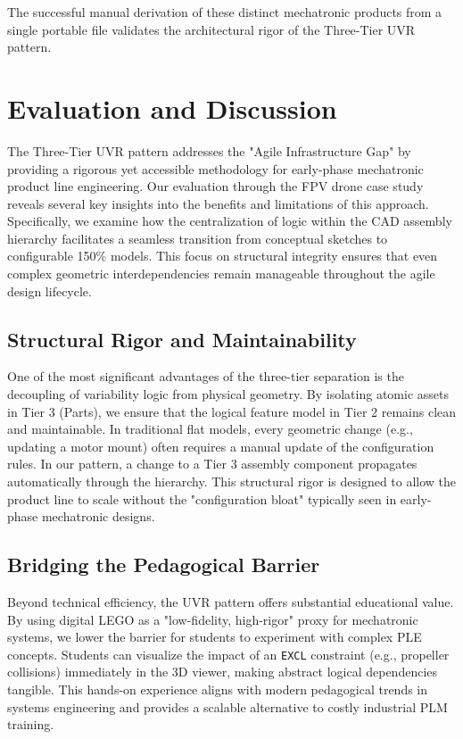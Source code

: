\documentclass[runningheads]{llncs}
\begin{document}
The successful manual derivation of these distinct mechatronic products from a single portable file validates the architectural rigor of the Three-Tier UVR pattern.

\section{Evaluation and Discussion}

The Three-Tier UVR pattern addresses the "Agile Infrastructure Gap" by providing a rigorous yet accessible methodology for early-phase mechatronic product line engineering. Our evaluation through the FPV drone case study reveals several key insights into the benefits and limitations of this approach. Specifically, we examine how the centralization of logic within the CAD assembly hierarchy facilitates a seamless transition from conceptual sketches to configurable 150\% models. This focus on structural integrity ensures that even complex geometric interdependencies remain manageable throughout the agile design lifecycle.

\subsection{Structural Rigor and Maintainability}

One of the most significant advantages of the three-tier separation is the decoupling of variability logic from physical geometry. By isolating atomic assets in Tier 3 (Parts), we ensure that the logical feature model in Tier 2 remains clean and maintainable. In traditional flat models, every geometric change (e.g., updating a motor mount) often requires a manual update of the configuration rules. In our pattern, a change to a Tier 3 assembly component propagates automatically through the hierarchy. This structural rigor is designed to allow the product line to scale without the "configuration bloat" typically seen in early-phase mechatronic designs.

\subsection{Bridging the Pedagogical Barrier}

Beyond technical efficiency, the UVR pattern offers substantial educational value. By using digital LEGO as a "low-fidelity, high-rigor" proxy for mechatronic systems, we lower the barrier for students to experiment with complex PLE concepts. Students can visualize the impact of an \texttt{EXCL} constraint (e.g., propeller collisions) immediately in the 3D viewer, making abstract logical dependencies tangible. This hands-on experience aligns with modern pedagogical trends in systems engineering and provides a scalable alternative to costly industrial PLM training.
\end{document}
